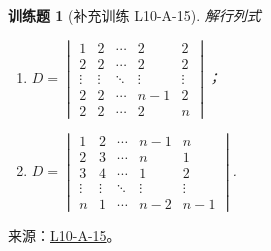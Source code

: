 \documentclass[12pt,fontset=fandol]{ctexart}
\newtheorem{exercise}{训练题}[section]
\begin{document}
\begin{exercise}[补充训练 L10-A-15]\label{prob:L10-A-15}
解行列式
        \begin{enumerate}
            \item $D=\begin{vmatrix}
                          1      & 2      & \cdots & 2      & 2      \\
                          2      & 2      & \cdots & 2      & 2      \\
                          \vdots & \vdots & \ddots & \vdots & \vdots \\
                          2      & 2      & \cdots & n-1    & 2      \\
                          2      & 2      & \cdots & 2      & n\end{vmatrix}$；

            \item $D=\begin{vmatrix}
                          1      & 2      & \cdots & n-1    & n      \\
                          2      & 3      & \cdots & n      & 1      \\
                          3      & 4      & \cdots & 1      & 2      \\
                          \vdots & \vdots & \ddots & \vdots & \vdots \\
                          n      & 1      & \cdots & n-2    & n-1
                      \end{vmatrix}$.
        \end{enumerate}
\end{exercise}
\noindent 来源：\href{https://github.com/yhwu-is/Linear-Algebra-Left-Undone/blob/new/%E8%AE%B2%E4%B9%89/%E4%B8%93%E9%A2%98/10%20%E8%A1%8C%E5%88%97%E5%BC%8F.tex}{L10-A-15}。
\end{document}
